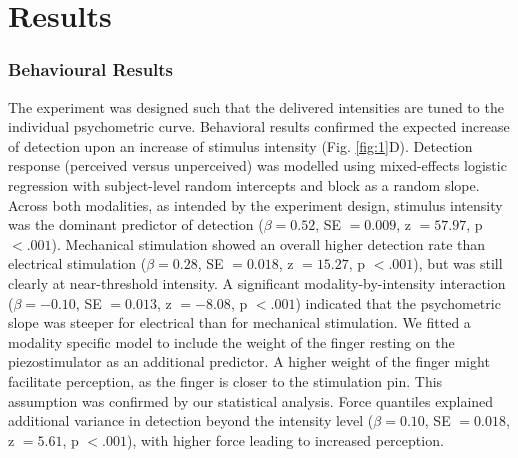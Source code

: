 \documentclass[11pt,a4paper,onecolumn]{article}
\begin{document}
\section*{Results}

\subsubsection*{Behavioural Results}
\vspace{-7pt}
The experiment was designed such that the delivered intensities are tuned to the individual psychometric curve. Behavioral results confirmed the expected increase of detection upon an increase of stimulus intensity (Fig. \ref{fig:1}D).
Detection response (perceived versus unperceived) was modelled using mixed-effects logistic regression with subject-level random intercepts and block as a random slope. Across both modalities, as intended by the experiment design, stimulus intensity was the dominant predictor of detection ($\beta = 0.52$, SE $= 0.009$, z $= 57.97$, p $< .001$). Mechanical stimulation showed an overall higher detection rate than electrical stimulation ($\beta = 0.28$, SE $= 0.018$, z $= 15.27$, p $< .001$), but was still clearly at near-threshold intensity. A significant modality-by-intensity interaction ($\beta = -0.10$, SE $= 0.013$, z $= -8.08$, p $< .001$) indicated that the psychometric slope was steeper for electrical than for mechanical stimulation. We fitted a modality specific model to include the weight of the finger resting on the piezostimulator as an additional predictor. A higher weight of the finger might facilitate perception, as the finger is closer to the stimulation pin. This assumption was confirmed by our statistical analysis. Force quantiles explained additional variance in detection beyond the intensity level ($\beta = 0.10$, SE $= 0.018$, z $= 5.61$, p $< .001$), with higher force leading to increased perception.
\end{document}
